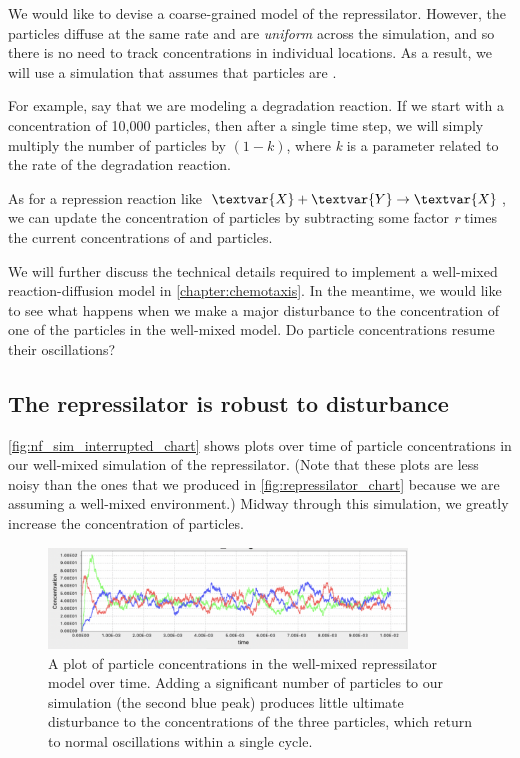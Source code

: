 We would like to devise a coarse-grained model of the repressilator. However, the particles diffuse at the same rate and are \textit{uniform} across the simulation, and so there is no need to track concentrations in individual locations. As a result, we will use a simulation that assumes that particles are .

For example, say that we are modeling a degradation reaction. If we start with a concentration of 10,000  particles, then after a single time step, we will simply multiply the number of  particles by $(1-k)$, where \textit{k} is a parameter related to the rate of the degradation reaction.

As for a repression reaction like $\textvar{X} + \textvar{Y} \rightarrow \textvar{X}$, we can update the concentration of  particles by subtracting some factor \textit{r} times the current concentrations of  and  particles.

We will further discuss the technical details required to implement a well-mixed reaction-diffusion model in \autoref{chapter:chemotaxis}. In the meantime, we would like to see what happens when we make a major disturbance to the concentration of one of the particles in the well-mixed model. Do particle concentrations resume their oscillations?

\FloatBarrier
{}
\subsection{The repressilator is robust to disturbance}

\autoref{fig:nf_sim_interrupted_chart} shows plots over time of particle concentrations in our well-mixed simulation of the repressilator. (Note that these plots are less noisy than the ones that we produced in \autoref{fig:repressilator_chart} because we are assuming a well-mixed environment.) Midway through this simulation, we greatly increase the concentration of  particles.

\begin{figure}[h]
\centering
\mySfFamily
\includegraphics[width = 0.85\textwidth]{../images/nf_sim_interrupted_chart_spike.png}
\caption{A plot of particle concentrations in the well-mixed repressilator model over time. Adding a significant number of  particles to our simulation (the second blue peak) produces little ultimate disturbance to the concentrations of the three particles, which return to normal oscillations within a single cycle.}
\label{fig:nf_sim_interrupted_chart}
\end{figure}

